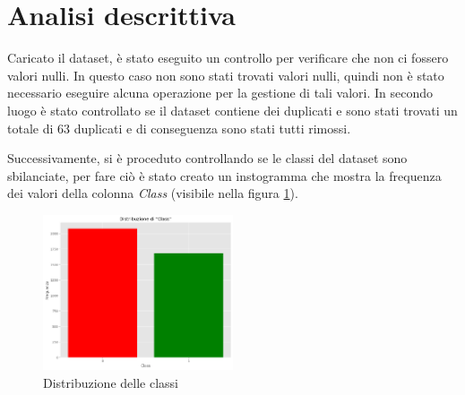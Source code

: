 
\section{Analisi descrittiva}\label{sec:analisi-descrittiva}

Caricato il dataset, è stato eseguito un controllo per verificare che non ci fossero
valori nulli. In questo caso non sono stati trovati valori nulli, quindi non è
stato necessario eseguire alcuna operazione per la gestione di tali valori. In
secondo luogo è stato controllato se il dataset contiene dei duplicati e sono stati
trovati un totale di $63$ duplicati e di conseguenza sono stati tutti rimossi.

Successivamente, si è proceduto controllando se le classi del dataset sono sbilanciate,
per fare ciò è stato creato un instogramma che mostra la frequenza dei valori 
della colonna \textit{Class} (visibile nella figura \ref{fig:dist-classi}).

\begin{figure}[!h]
      \centering
      \includegraphics[width=0.5\textwidth]{img/analisi/distribuzioneClassi.png}
      \caption{Distribuzione delle classi}
      \label{fig:dist-classi}
\end{figure}

